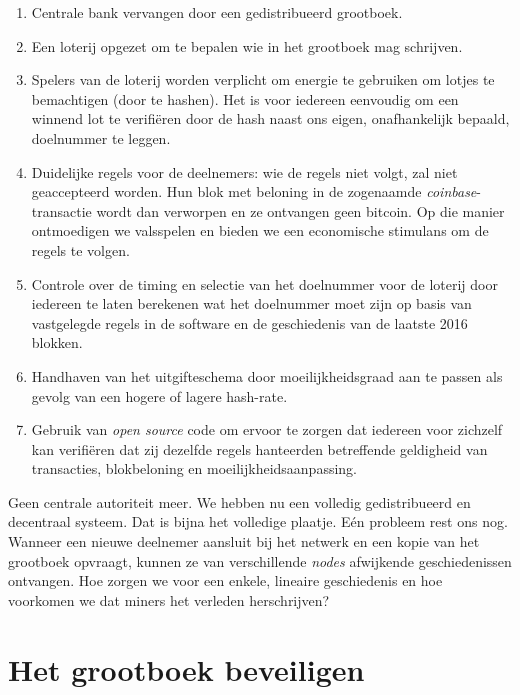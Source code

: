 \documentclass[
  letterpaper,
]{scrbook}
\begin{document}
\begin{enumerate}
\def\labelenumi{\arabic{enumi}.}
\item
  Centrale bank vervangen door een gedistribueerd grootboek.
\item
  Een loterij opgezet om te bepalen wie in het grootboek mag schrijven.
\item
  Spelers van de loterij worden verplicht om energie te gebruiken om
  lotjes te bemachtigen (door te hashen). Het is voor iedereen eenvoudig
  om een winnend lot te verifiëren door de hash naast ons eigen,
  onafhankelijk bepaald, doelnummer te leggen.
\item
  Duidelijke regels voor de deelnemers: wie de regels niet volgt, zal
  niet geaccepteerd worden. Hun blok met beloning in de zogenaamde
  \emph{coinbase}-transactie wordt dan verworpen en ze ontvangen geen
  bitcoin. Op die manier ontmoedigen we valsspelen en bieden we een
  economische stimulans om de regels te volgen.
\item
  Controle over de timing en selectie van het doelnummer voor de loterij
  door iedereen te laten berekenen wat het doelnummer moet zijn op basis
  van vastgelegde regels in de software en de geschiedenis van de
  laatste 2016 blokken.
\item
  Handhaven van het uitgifteschema door moeilijkheidsgraad aan te passen
  als gevolg van een hogere of lagere hash-rate.
\item
  Gebruik van \emph{open source} code om ervoor te zorgen dat iedereen
  voor zichzelf kan verifiëren dat zij dezelfde regels hanteerden
  betreffende geldigheid van transacties, blokbeloning en
  moeilijkheidsaanpassing.
\end{enumerate}

Geen centrale autoriteit meer. We hebben nu een volledig gedistribueerd
en decentraal systeem. Dat is bijna het volledige plaatje. Eén probleem
rest ons nog. Wanneer een nieuwe deelnemer aansluit bij het netwerk en
een kopie van het grootboek opvraagt, kunnen ze van verschillende
\emph{nodes} afwijkende geschiedenissen ontvangen. Hoe zorgen we voor
een enkele, lineaire geschiedenis en hoe voorkomen we dat miners het
verleden herschrijven?


\hypertarget{het-grootboek-beveiligen}{%
\chapter{Het grootboek beveiligen}\label{het-grootboek-beveiligen}}
\end{document}
